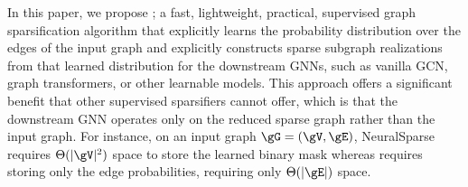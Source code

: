 % 






In this paper, we propose \sgs; a fast, lightweight, practical, supervised graph sparsification algorithm that explicitly learns the probability distribution over the edges of the input graph and explicitly constructs sparse subgraph realizations from that learned distribution for the downstream GNNs, such as vanilla GCN, graph transformers, or other learnable models. This approach offers a significant benefit that other supervised sparsifiers cannot offer, which is that the downstream GNN operates only on the reduced sparse graph rather than the input graph. For instance, on an input graph $\gG = (\gV,\gE)$, NeuralSparse requires $\Theta(|\gV|^2)$ space to store the learned binary mask whereas \sgs requires storing only the edge probabilities, requiring only $\Theta(|\gE|)$ space.

